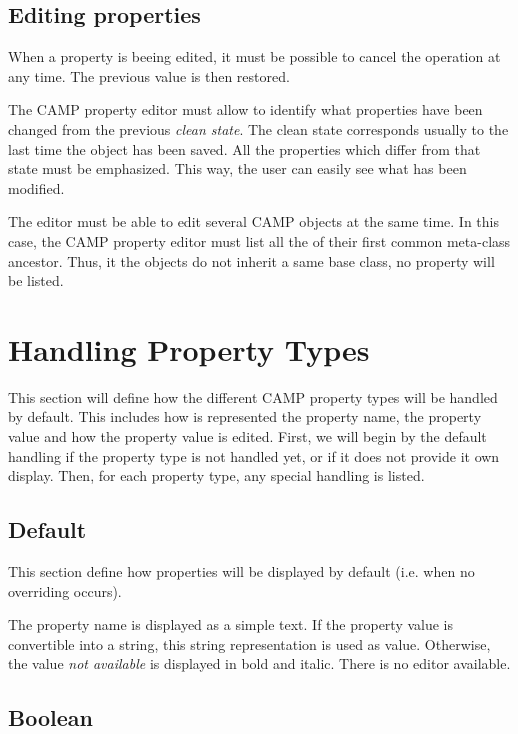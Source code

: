 \documentclass[a4paper, twoside]{report}
\begin{document}
\section{Editing properties}

When a property is beeing edited, it must be possible to cancel the operation at any time. The
previous value is then restored.

The CAMP property editor must allow to identify what properties have been changed from the previous
\emph{clean state}. The clean state corresponds usually to the last time the object has been saved.
All the properties which differ from that state must be emphasized. This way, the user can easily
see what has been modified.

The editor must be able to edit several CAMP objects at the same time. In this case, the CAMP
property editor must list all the of their first common meta-class ancestor. Thus, it the objects
do not inherit a same base class, no property will be listed.

\chapter{Handling Property Types\label{sec:property_types}}

This section will define how the different CAMP property types will be handled by default. This
includes how is represented the property name, the property value and how the property value is
edited. First, we will begin by the default handling if the property type is not handled yet,
or if it does not provide it own display. Then, for each property type, any special handling is
listed.

\section{Default}

This section define how properties will be displayed by default (i.e. when no overriding occurs).

The property name is displayed as a simple text. If the property value is convertible into a string,
this string representation is used as value. Otherwise, the value \emph{not available} is displayed
in bold and italic. There is no editor available.

\section{Boolean}
\end{document}
